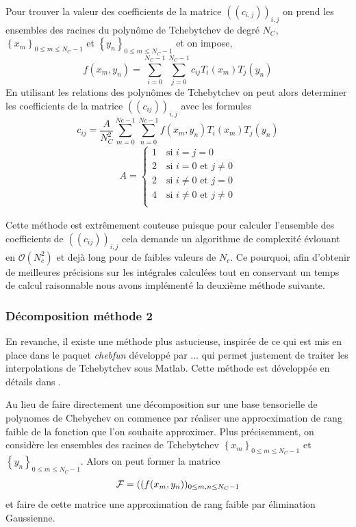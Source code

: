 \documentclass[10pt]{article}
\begin{document}
\begin{multicols}{2}
Pour trouver la valeur des coefficients de la matrice $((c_{i,j}))_{i,j}$ on prend les ensembles des racines du polynôme de Tchebytchev  de degré $N_C$, $\left\{x_m\right\}_{0\le m \le N_C-1}$ et $\left\{y_n\right\}_{0\le m \le N_C-1}$ et on impose,
\begin{equation}
  f(x_m, y_n) = \sum_{i=0}^{N_C-1}\sum_{j=0}^{N_C-1} c_{ij} T_i(x_m)T_j(y_n)
\end{equation}
En utilisant les relations des polynômes de Tchebytchev on peut alors determiner les coefficients de la matrice $((c_{ij}))_{i,j}$ avec les formules
\begin{equation}
 c_{ij} = \frac{A}{N_C^2} \sum_{m=0}^{Nc-1} \sum_{n=0}^{Nc-1} f(x_m, y_n)T_i(x_m)T_j(y_n)
\end{equation}
\begin{align}
  A = 
  \begin{cases}
    1 \quad \text{si } i = j = 0 \\
    2 \quad \text{si } i = 0 \text{ et } j \neq 0 \\
    2 \quad \text{si } i \neq 0 \text{ et } j = 0 \\
    4 \quad \text{si } i \neq 0 \text{ et } j \neq 0 \\
  \end{cases}
\end{align}

Cette méthode est extrêmement couteuse puisque pour calculer l'ensemble des coefficients de $((c_{ij}))_{i,j}$ cela demande un algorithme de complexité évlouant en $\mathcal{O}(N_c^2)$ et dejà long pour de faibles valeurs de $N_c$. Ce pourquoi, afin d'obtenir de meilleures précisions sur les intégrales calculées tout en conservant un temps de calcul raisonnable nous avons implémenté la deuxième méthode suivante.


\vspace*{11pt}

\subsubsection{Décomposition méthode 2}
En revanche, il existe une méthode plus astucieuse, inspirée de ce qui est mis en place dans le paquet \textit{chebfun} développé par ... qui permet justement de traiter les interpolations de Tchebytchev sous Matlab. Cette méthode est développée en détails dans \cite{TownsendThesis}. 

Au lieu de faire directement une décomposition sur une base tensorielle de polynomes de Chebychev on commence par réaliser une approcximation de rang faible de la fonction que l'on souhaite approximer. Plus précisemment, on considère les ensembles des racines de Tchebytchev $\left\{x_m\right\}_{0\le m \le N_C-1}$ et $\left\{y_n\right\}_{0\le m \le N_C-1}$. Alors on peut former la matrice 
\begin{equation}
	\mathcal{F}  =((f(x_m, y_n ))_{0\le m,n \le N_C-1}
\end{equation}
et faire de cette matrice une approximation de rang faible par élimination Gaussienne.


\end{multicols}
\end{document}
